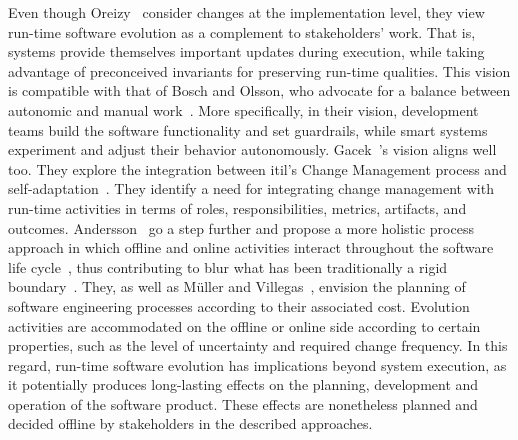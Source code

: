 Even though Oreizy~\etal{} consider changes at the implementation level, they view run-time software evolution as a complement to stakeholders' work. That is, systems provide themselves important updates during execution, while taking advantage of preconceived invariants for preserving run-time qualities. This vision is compatible with that of Bosch and Olsson, who advocate for a balance between autonomic and manual work~\cite{bosch-2016-data}. More specifically, in their vision, development teams build the software functionality and set guardrails, while smart systems experiment and adjust their behavior autonomously. Gacek~\etal{}'s vision aligns well too. They explore the integration between \acrshort{itil}'s Change Management process and self-adaptation~\cite{gacek-2008-friends}. They identify a need for integrating change management with run-time activities in terms of roles, responsibilities, metrics, artifacts, and outcomes. Andersson~\etal{} go a step further and propose a more holistic process approach in which offline and online activities interact throughout the software life cycle~\cite{andersson-2013-software}, thus contributing to blur what has been traditionally a rigid boundary~\cite{baresi-2010-disappearing}. They, as well as M\"{u}ller and Villegas~\cite{muller-2014-highly}, envision the planning of software engineering processes according to their associated cost. Evolution activities are accommodated on the offline or online side according to certain properties, such as the level of uncertainty and required change frequency. In this regard, run-time software evolution has implications beyond system execution, as it potentially produces long-lasting effects on the planning, development and operation of the software product. These effects are nonetheless planned and decided offline by stakeholders in the described approaches.

